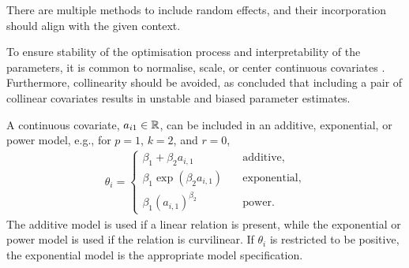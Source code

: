 There are multiple methods to include random effects, and their incorporation should align with the given context.

To ensure stability of the optimisation process and interpretability of the parameters, it is common to normalise, scale, or center continuous covariates \citep[p. 249]{bonate}. Furthermore, collinearity should be avoided, as \cite{Bonate1999} concluded that including a pair of collinear covariates results in unstable and biased parameter estimates.

A continuous covariate, $a_{i1} \in \mathbb{R}$, can be included in an additive, exponential, or power model, e.g., for $p = 1$, $k = 2$, and $r = 0$,
\begin{align} 
    \theta_{i} = \begin{cases}
        \beta_{1} + \beta_{2} a_{i,1}  & \text{additive}, \\ 
    \beta_{1} \exp( \beta_{2}  a_{i,1}) \quad & \text{exponential}, \\ 
    \beta_{1} ( a_{i,1} )^{\beta_{2}} & \text{power}.\label{eq: continuous covariate model} 
    \end{cases}
\end{align}
The additive model is used if a linear relation is present, while the exponential or power model is used if the relation is curvilinear. If $\theta_{i}$ is restricted to be positive, the exponential model is the appropriate model specification.

